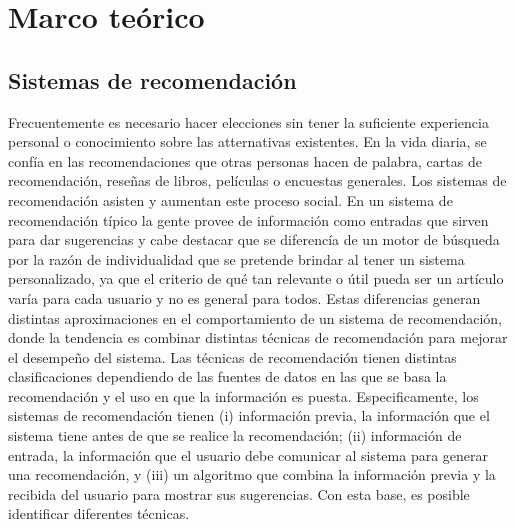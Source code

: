 \chapter {Marco teórico}
 \section{Sistemas de recomendación}
 	Frecuentemente es necesario hacer elecciones sin tener la suficiente experiencia personal o conocimiento sobre las atternativas existentes. En la vida diaria, se confía en las recomendaciones que otras personas hacen de palabra, cartas de recomendación, reseñas de libros, películas o encuestas generales. \cite{4}
 	Los sistemas de recomendación asisten y aumentan este proceso social. En un sistema de recomendación típico la gente provee de información como entradas que sirven para dar sugerencias y cabe destacar que se diferencía de un motor de búsqueda por la razón de individualidad que se pretende brindar al tener un sistema personalizado, ya que el criterio de qué tan relevante o útil pueda ser un artículo varía para cada usuario y no es general para todos. Estas diferencias generan distintas aproximaciones en el comportamiento de un sistema de recomendación, donde la tendencia es combinar distintas técnicas de recomendación para mejorar el desempeño del sistema. Las técnicas de recomendación tienen distintas clasificaciones dependiendo de las fuentes de datos en las que se basa la recomendación y el uso en que la información es puesta. Especificamente, los sistemas de recomendación tienen (i) información previa, la información que el sistema tiene antes de que se realice la recomendación; (ii) información de entrada, la información que el usuario debe comunicar al sistema para generar una recomendación, y (iii) un algoritmo que combina la información previa y la recibida del usuario para mostrar sus sugerencias. Con esta base, es posible identificar diferentes técnicas.%

